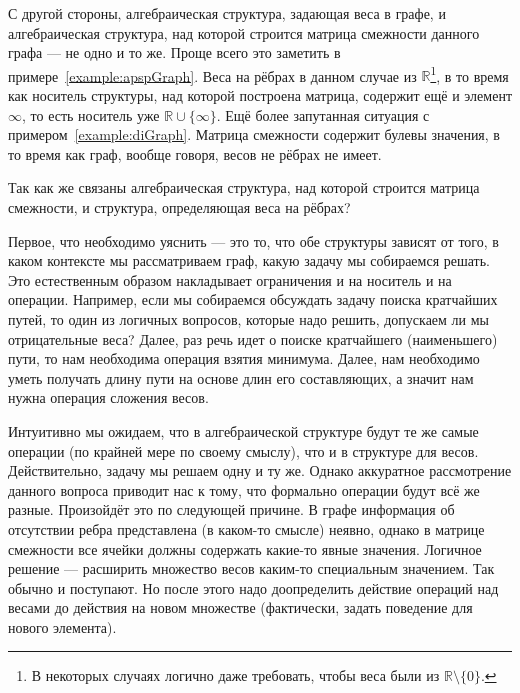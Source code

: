 С другой стороны, алгебраическая структура, задающая веса в графе, и алгебраическая структура, над которой строится матрица смежности данного графа --- не одно и то же. Проще всего это заметить в примере~\ref{example:apspGraph}. Веса на рёбрах в данном случае из $\mathbb{R}$\footnote{В некоторых случаях логично даже требовать, чтобы веса были из $\mathbb{R} \setminus \{0\}$.}, в то время как носитель структуры, над которой построена матрица, содержит ещё и элемент $\infty$, то есть носитель уже $\mathbb{R}\cup\{\infty\}$. Ещё более запутанная ситуация с примером~\ref{example:diGraph}. Матрица смежности содержит булевы значения, в то время как граф, вообще говоря, весов не рёбрах не имеет.

Так как же связаны алгебраическая структура, над которой строится матрица смежности, и структура, определяющая веса на рёбрах? 

Первое, что необходимо уяснить --- это то, что обе структуры зависят от того, в каком контексте мы рассматриваем граф, какую задачу мы собираемся решать. Это естественным образом накладывает ограничения и на носитель и на операции. Например, если мы собираемся обсуждать задачу поиска кратчайших путей, то один из логичных вопросов, которые надо решить, допускаем ли мы отрицательные веса? Далее, раз речь идет о поиске кратчайшего (наименьшего) пути, то нам необходима операция взятия минимума. Далее, нам необходимо уметь получать длину пути на основе длин его составляющих, а значит нам нужна операция сложения весов.

Интуитивно мы ожидаем, что в алгебраической структуре будут те же самые операции (по крайней мере по своему смыслу), что и в структуре для весов. Действительно, задачу мы решаем одну и ту же. Однако аккуратное рассмотрение данного вопроса приводит нас к тому, что формально операции будут всё же разные. Произойдёт это по следующей причине. В графе информация об отсутствии ребра представлена (в каком-то смысле) неявно, однако в матрице смежности все ячейки должны содержать какие-то явные значения. Логичное решение --- расширить множество весов каким-то специальным значением. Так обычно и поступают. Но после этого надо доопределить действие операций над весами до действия на новом множестве (фактически, задать поведение для нового элемента).

